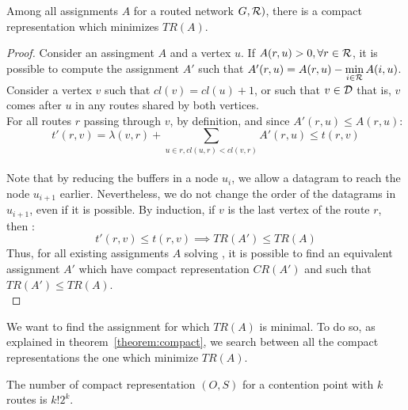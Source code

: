 \documentclass[english]{article}
\begin{document}
\begin{theorem}
Among all assignments $A$ for a routed network $G,{\cal R})$, there is a compact representation which minimizes $TR(A)$.
\label{theorem:compact}
\end{theorem}
\begin{proof}
Consider an assingment $A$ and a vertex $u$.
If $A(r,u) > 0, \forall r \in {\cal R}$, it is possible to compute the assignment $A'$ such that
$A'(r,u) = A(r,u)-\min\limits_{i \in {\cal R}} A(i,u)$. Consider a vertex $v$ such that $cl(v) = cl(u) +1$, or such that $v \in {\cal D}$ that is, $v$ comes after $u$ in any routes shared by both vertices.\\
For all routes $r$ passing through $v$, by definition, and since $A'(r,u) \leq A(r,u)$: $$t'(r,v) = \lambda(v,r) + \sum_{u \in r, cl(u,r) < cl(v,r)} A'(r,u)  \leq t(r,v)$$\\
Note that by reducing the buffers in a node $u_i$, we allow a datagram to reach the node $u_{i+1}$ earlier. Nevertheless, we do not change the order of the datagrams in $u_{i+1}$, even if it is possible.
By induction, if $v$ is the last vertex of the route $r$, then : $$t'(r,v) \leq t(r,v) \implies TR(A') \leq TR(A)$$
Thus, for all existing assignments $A$ solving \spall, it is possible to find an equivalent assignment $A'$ which have compact representation $CR(A')$ and such that $TR(A') \leq TR(A)$.\\
\end{proof}


We want to find the assignment for which $TR(A)$ is minimal. To do so, as explained in theorem~\ref{theorem:compact}, we search between all the compact representations the one which minimize $TR(A)$.

\begin{lemma}
 The number of compact representation $(O,S)$ for a contention point with $k$ routes is $k!2^{k}$.
 \label{lemma:numberarcs}
\end{lemma}
\end{document}
